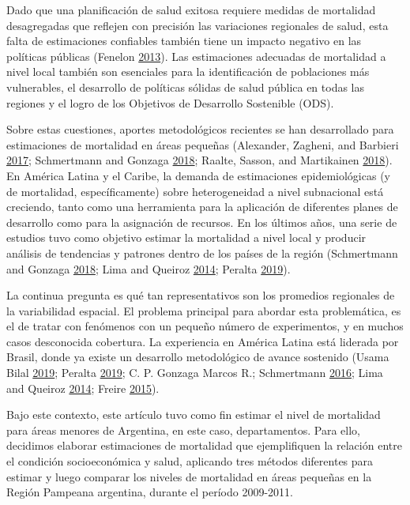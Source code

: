\documentclass[12pt,]{article}
\begin{document}
Dado que una planificación de salud exitosa requiere medidas de
mortalidad desagregadas que reflejen con precisión las variaciones
regionales de salud, esta falta de estimaciones confiables también tiene
un impacto negativo en las políticas públicas (Fenelon
\protect\hyperlink{ref-Fenelon2013}{2013}). Las estimaciones adecuadas
de mortalidad a nivel local también son esenciales para la
identificación de poblaciones más vulnerables, el desarrollo de
políticas sólidas de salud pública en todas las regiones y el logro de
los Objetivos de Desarrollo Sostenible (ODS).

Sobre estas cuestiones, aportes metodológicos recientes se han
desarrollado para estimaciones de mortalidad en áreas pequeñas
(Alexander, Zagheni, and Barbieri
\protect\hyperlink{ref-Alexander2017}{2017}; Schmertmann and Gonzaga
\protect\hyperlink{ref-Schmertmann2018}{2018}; Raalte, Sasson, and
Martikainen \protect\hyperlink{ref-van_Raalte1002}{2018}). En América
Latina y el Caribe, la demanda de estimaciones epidemiológicas (y de
mortalidad, específicamente) sobre heterogeneidad a nivel subnacional
está creciendo, tanto como una herramienta para la aplicación de
diferentes planes de desarrollo como para la asignación de recursos. En
los últimos años, una serie de estudios tuvo como objetivo estimar la
mortalidad a nivel local y producir análisis de tendencias y patrones
dentro de los países de la región (Schmertmann and Gonzaga
\protect\hyperlink{ref-Schmertmann2018}{2018}; Lima and Queiroz
\protect\hyperlink{ref-LimaQueiroz2014}{2014}; Peralta
\protect\hyperlink{ref-Peralta2019}{2019}).

La continua pregunta es qué tan representativos son los promedios
regionales de la variabilidad espacial. El problema principal para
abordar esta problemática, es el de tratar con fenómenos con un pequeño
número de experimentos, y en muchos casos desconocida cobertura. La
experiencia en América Latina está liderada por Brasil, donde ya existe
un desarrollo metodológico de avance sostenido (Usama Bilal
\protect\hyperlink{ref-Bilal2019}{2019}; Peralta
\protect\hyperlink{ref-Peralta2019}{2019}; C. P. Gonzaga Marcos R.;
Schmertmann \protect\hyperlink{ref-GonzagaSchmertmann2016}{2016}; Lima
and Queiroz \protect\hyperlink{ref-LimaQueiroz2014}{2014}; Freire
\protect\hyperlink{ref-FreireEtAl2015}{2015}).

Bajo este contexto, este artículo tuvo como fin estimar el nivel de
mortalidad para áreas menores de Argentina, en este caso, departamentos.
Para ello, decidimos elaborar estimaciones de mortalidad que
ejemplifiquen la relación entre el condición socioeconómica y salud,
aplicando tres métodos diferentes para estimar y luego comparar los
niveles de mortalidad en áreas pequeñas en la Región Pampeana argentina,
durante el período 2009-2011.
\end{document}
